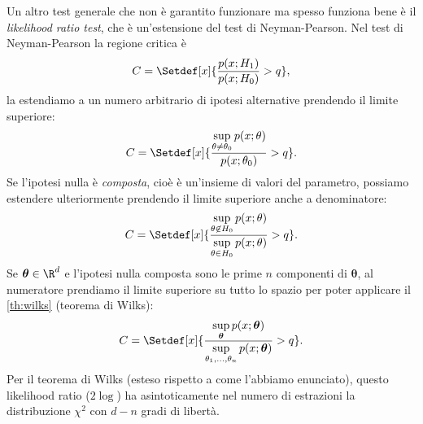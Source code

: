 Un altro test generale che non è garantito funzionare ma spesso funziona bene
è il \emph{likelihood ratio test}, che è un'estensione del test di Neyman-Pearson.
Nel test di Neyman-Pearson la regione critica è
\begin{equation*}
	C = \Setdef[x]{\frac{p(x;H_1)}{p(x;H_0)} > q},
\end{equation*}
la estendiamo a un numero arbitrario di ipotesi alternative prendendo il limite superiore:
\begin{equation*}
	C = \Setdef[x]{\frac {\sup\limits_{\theta\neq\theta_0} p(x;\theta)} {p(x;\theta_0)} > q}.
\end{equation*}
Se l'ipotesi nulla è \emph{composta},
cioè è un'insieme di valori del parametro,
possiamo estendere ulteriormente prendendo il limite superiore anche a denominatore:
\begin{equation*}
	C = \Setdef[x]{\frac {\sup\limits_{\theta\not\in H_0} p(x;\theta)} {\sup\limits_{\theta\in H_0} p(x;\theta)} > q}.
\end{equation*}
Se $\boldsymbol\theta\in\R^d$
e l'ipotesi nulla composta sono le prime $n$ componenti di $\boldsymbol\theta$,
al numeratore prendiamo il limite superiore su tutto lo spazio
per poter applicare il \autoref{th:wilks} (teorema di Wilks):
\begin{equation*}
	C = \Setdef[x]{\frac
	{\sup\limits_{\boldsymbol\theta} p(x;\boldsymbol\theta)}
	{\sup\limits_{\theta_1,\dotsc,\theta_n} p(x;\boldsymbol\theta)} > q}.
\end{equation*}
Per il teorema di Wilks (esteso rispetto a come l'abbiamo enunciato),
questo likelihood ratio ($2\log$) ha asintoticamente nel numero di estrazioni
la distribuzione $\chi^2$ con $d-n$ gradi di libertà.
